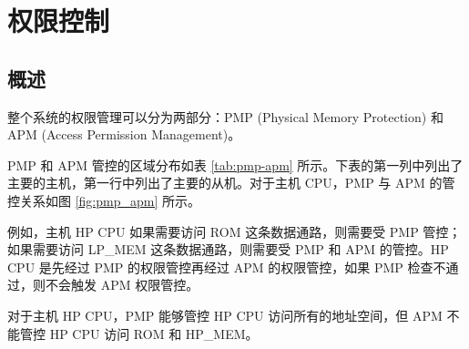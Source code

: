 \documentclass[main\_\_CN.tex]{subfiles}
\begin{document}

\ifglobal
\else
    {\let\clearpage\relax \listoftodos}
    {\let\clearpage\relax \listofdonetodos}
    \tableofcontents
\fi



\hypertarget{permctrl}{}
\chapter{权限控制}
\label{mod:permctrl}


\section{概述}


\chipname{} 整个系统的权限管理可以分为两部分：PMP (Physical Memory Protection) 和 APM (Access Permission Management)。 

PMP 和 APM 管控的区域分布如表 \ref{tab:pmp-apm} 所示。下表的第一列中列出了主要的主机，第一行中列出了主要的从机。对于主机 CPU，PMP 与 APM 的管控关系如图 \ref{fig:pmp_apm} 所示。

例如，主机 HP CPU 如果需要访问 ROM 这条数据通路，则需要受 PMP 管控；如果需要访问 LP\_MEM 这条数据通路，则需要受 PMP 和 APM 的管控。HP CPU 是先经过 PMP 的权限管控再经过 APM 的权限管控，如果 PMP 检查不通过，则不会触发 APM 权限管控。

对于主机 HP CPU，PMP 能够管控 HP CPU 访问所有的地址空间，但 APM 不能管控 HP CPU 访问 ROM 和 HP\_MEM。
\end{document}
